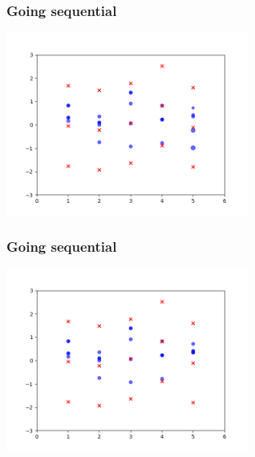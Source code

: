 \documentclass{beamer}
\begin{document}
\begin{frame}[fragile]
\frametitle{Going sequential}

\begin{center}
\includegraphics[width=80mm]{pfilt_anim_9.png}
\end{center}

\end{frame}
\begin{frame}[fragile]
\frametitle{Going sequential}

\begin{center}
\includegraphics[width=80mm]{pfilt_anim_10.png}
\end{center}

\end{frame}




\begin{frame}
\printbibliography
\end{frame}
\end{document}
